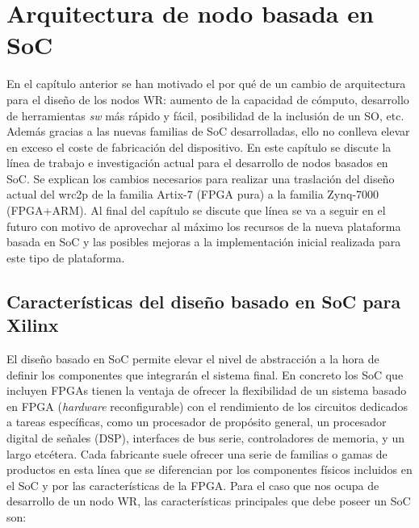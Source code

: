 \chapter{Arquitectura de nodo basada en SoC}

En el capítulo anterior se han motivado el por qué de un cambio de arquitectura 
para el diseño de los nodos WR: aumento de la capacidad de cómputo, desarrollo 
de herramientas \textit{sw} más rápido y fácil, posibilidad de la inclusión de 
un SO, etc. Además gracias a las nuevas familias de SoC desarrolladas, ello no 
conlleva elevar en exceso el coste de fabricación del dispositivo. 
En este capítulo se discute la línea de trabajo e investigación actual para el 
desarrollo de nodos basados en SoC. Se explican los cambios necesarios para 
realizar una traslación del diseño actual del \gls{wrc2p} de la familia Artix-7 
(FPGA pura) a la familia Zynq-7000 (FPGA+ARM). Al final del capítulo se discute 
que línea se va a seguir en el futuro con motivo de aprovechar al máximo los 
recursos de la nueva plataforma basada en SoC y las posibles mejoras a la 
implementación inicial realizada para este tipo de plataforma.

\section{Características del diseño basado en SoC para Xilinx}

El diseño basado en SoC permite elevar el nivel de abstracción a la hora de 
definir los componentes que integrarán el sistema final. En concreto los SoC 
que incluyen FPGAs tienen la ventaja de ofrecer la flexibilidad de un sistema 
basado en FPGA (\textit{hardware} reconfigurable) con el rendimiento de los 
circuitos dedicados a tareas específicas, como un procesador de propósito 
general, un procesador digital de señales (DSP), interfaces de bus serie, 
controladores de memoria, y un largo etcétera. Cada fabricante suele ofrecer 
una serie de familias o gamas de productos en esta línea que se diferencian por 
los componentes físicos incluidos en el SoC y por las características de la 
FPGA. Para el caso que nos ocupa de desarrollo de un nodo WR, las 
características principales que debe poseer un SoC son:

